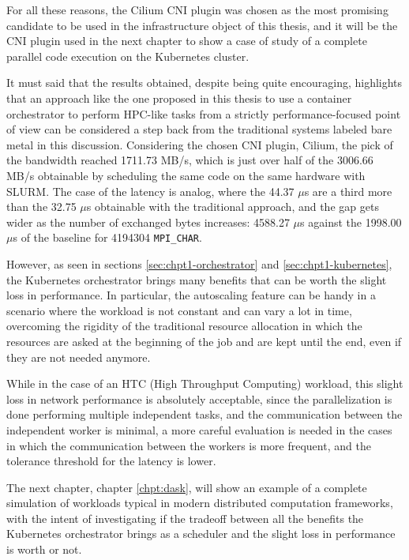 For all these reasons, the Cilium CNI plugin was chosen as the most promising
candidate to be used in the infrastructure object of this thesis, and it will be
the CNI plugin used in the next chapter to show a case of study of a complete
parallel code execution on the Kubernetes cluster.

It must said that the results obtained, despite being quite encouraging,
highlights that an approach like the one proposed in this thesis to use a
container orchestrator to perform HPC-like tasks from a strictly
performance-focused point of view can be considered a step back from the
traditional systems labeled bare metal in this discussion.
Considering the chosen CNI plugin, Cilium, the pick of the bandwidth reached
1711.73 MB/s, which is just over half of the 3006.66 MB/s obtainable by
scheduling the same code on the same hardware with SLURM.
The case of the latency is analog, where the 44.37 $\mu$s are a third more than
the 32.75 $\mu$s obtainable with the traditional approach, and the gap gets
wider as the number of exchanged bytes increases: 4588.27 $\mu$s against the
1998.00 $\mu$s of the baseline for 4194304 \texttt{MPI\_CHAR}.

However, as seen in sections \ref{sec:chpt1-orchestrator} and
\ref{sec:chpt1-kubernetes}, the Kubernetes orchestrator brings many benefits
that can be worth the slight loss in performance.
In particular, the autoscaling feature can be handy in a scenario where the
workload is not constant and can vary a lot in time, overcoming the rigidity of
the traditional resource allocation in which the resources are asked at the
beginning of the job and are kept until the end, even if they are not needed
anymore.

While in the case of an HTC (High Throughput Computing) workload, this slight
loss in network performance is absolutely acceptable, since the parallelization
is done performing multiple independent tasks, and the communication between the
independent worker is minimal, a more careful evaluation is needed in the cases
in which the communication between the workers is more frequent, and the
tolerance threshold for the latency is lower.

The next chapter, chapter \ref{chpt:dask}, will show an example of a complete
simulation of workloads typical in modern distributed computation frameworks,
with the intent of investigating if the tradeoff between all the benefits the
Kubernetes orchestrator brings as a scheduler and the slight loss in performance
is worth or not.

